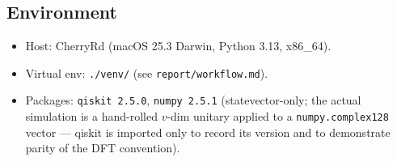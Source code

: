 \documentclass[11pt]{article}
\begin{document}
\subsection{Environment}
\begin{itemize}
\item Host: CherryRd (macOS 25.3 Darwin, Python 3.13, x86\_64).
\item Virtual env: \texttt{./venv/} (see \texttt{report/workflow.md}).
\item Packages: \texttt{qiskit 2.5.0}, \texttt{numpy 2.5.1}
      (statevector-only; the actual simulation is a hand-rolled $v$-dim
      unitary applied to a \texttt{numpy.complex128} vector --- qiskit
      is imported only to record its version and to demonstrate parity
      of the DFT convention).
\end{itemize}
\end{document}

